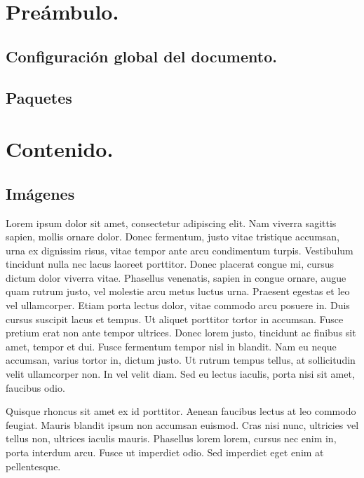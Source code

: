 \chapter{Preámbulo.}

\section{Configuración global del documento.}

\section{Paquetes}

\chapter{Contenido.}

\section{Imágenes}

	Lorem ipsum dolor sit amet, consectetur adipiscing elit. Nam viverra sagittis sapien, mollis ornare dolor. Donec fermentum, justo vitae tristique accumsan, urna ex dignissim risus, vitae tempor ante arcu condimentum turpis. Vestibulum tincidunt nulla nec lacus laoreet porttitor. Donec placerat congue mi, cursus dictum dolor viverra vitae. Phasellus venenatis, sapien in congue ornare, augue quam rutrum justo, vel molestie arcu metus luctus urna. Praesent egestas et leo vel ullamcorper. Etiam porta lectus dolor, vitae commodo arcu posuere in. Duis cursus suscipit lacus et tempus. Ut aliquet porttitor tortor in accumsan. Fusce pretium erat non ante tempor ultrices. Donec lorem justo, tincidunt ac finibus sit amet, tempor et dui. Fusce fermentum tempor nisl in blandit. Nam eu neque accumsan, varius tortor in, dictum justo. Ut rutrum tempus tellus, at sollicitudin velit ullamcorper non. In vel velit diam. Sed eu lectus iaculis, porta nisi sit amet, faucibus odio.
	
	Quisque rhoncus sit amet ex id porttitor. Aenean faucibus lectus at leo commodo feugiat. Mauris blandit ipsum non accumsan euismod. Cras nisi nunc, ultricies vel tellus non, ultrices iaculis mauris. Phasellus lorem lorem, cursus nec enim in, porta interdum arcu. Fusce ut imperdiet odio. Sed imperdiet eget enim at pellentesque.
	
